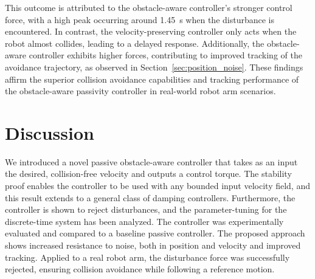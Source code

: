 
This outcome is attributed to the obstacle-aware controller's stronger control force, with a high peak occurring around \qty{1.45}{s} when the disturbance is encountered. In contrast, the velocity-preserving controller only acts when the robot almost collides, leading to a delayed response. Additionally, the obstacle-aware controller exhibits higher forces, contributing to improved tracking of the avoidance trajectory\iflong, as observed in Section~\ref{sec:position_noise}\fi. These findings affirm the superior collision avoidance capabilities and tracking performance of the obstacle-aware passivity controller in real-world robot arm scenarios.

\section{Discussion}
We introduced a novel passive obstacle-aware controller that takes as an input the desired, collision-free velocity and outputs a control torque. 
The stability proof enables the controller to be used with any bounded input velocity field, and this result extends to a general class of damping controllers.
Furthermore, the controller is shown to reject disturbances, and the parameter-tuning for the discrete-time system has been analyzed. 
The controller was experimentally evaluated and compared to a baseline passive controller. 
\iflong The proposed approach shows increased resistance to noise, both in position and velocity and improved tracking. \fi
Applied to a real robot arm, the disturbance force was successfully rejected, ensuring collision avoidance while following a reference motion.

